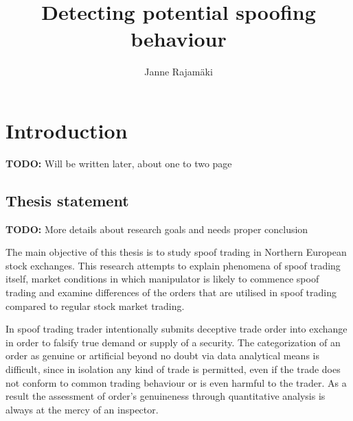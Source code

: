 \documentclass{tut-thesis}
\author 		{Janne Rajamäki}
\title 		[Potentiaalisten valekauppojen tunnistaminen]
			{Detecting potential spoofing behaviour}
\date 		{\Today}		%
\begin{document}
\maketitle
\frontmatter

\begin{abstract}
	\blindtext
\end{abstract}

\begin{otherlanguage}{finnish}
\begin{abstract}
\end{abstract}
\end{otherlanguage}

\tableofcontents
\listoftables


\mainmatter
\chapter{Introduction}
\textbf{TODO:} Will be written later, about one to two page 

\section{Thesis statement}
\textbf{TODO:} More details about research goals and needs proper conclusion

The main objective of this thesis is to study spoof trading in Northern European stock exchanges. This research attempts to explain phenomena of spoof trading itself, market conditions in which manipulator is likely to commence spoof trading and examine differences of the orders that are utilised in spoof trading compared to regular stock market trading. 

In spoof trading trader intentionally submits deceptive trade order into exchange in order to falsify true demand or supply of a security. The categorization of an order as genuine or artificial beyond no doubt via data analytical means is difficult, since in isolation any kind of trade is permitted, even if the trade does not conform to common trading behaviour or is even harmful to the trader. As a result the assessment of order's genuineness through quantitative analysis is always at the mercy of an inspector.
\end{document}
